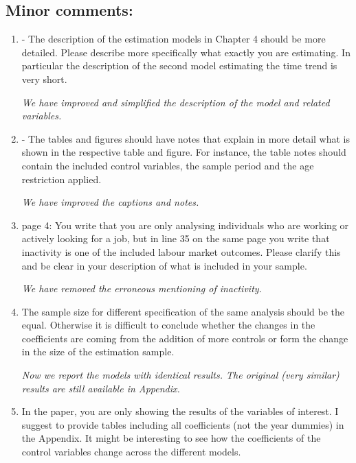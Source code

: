 \documentclass{article}
\newenvironment{response}
{\slshape}{}
\begin{document}
\subsection{Minor comments:}

\begin{enumerate}
\item- The description of the estimation models in Chapter 4 should
  be more detailed. Please describe more specifically what exactly you
  are estimating. In particular the description of the second model
  estimating the time trend is very short.

  \begin{response}
    We have improved and simplified the description of the model and related variables.
  \end{response}
\item - The tables and figures should have notes that explain in more
  detail what is shown in the respective table and figure. For
  instance, the table notes should contain the included control
  variables, the sample period and the age restriction applied.

  \begin{response}
    We have improved the captions and notes.
  \end{response}

\item page 4: You write that you are only analysing individuals who are
working or actively looking for a job, but in line 35 on the same page
you write that inactivity is one of the included labour market
outcomes. Please clarify this and be clear in your description of what
is included in your sample.

\begin{response}
  We have removed the erroneous mentioning of inactivity. 
\end{response}
\item  The sample size for different specification of the same analysis
  should be the equal. Otherwise it is difficult to conclude whether the
  changes in the coefficients are coming from the addition of more
  controls or form the change in the size of the estimation sample.

  \begin{response}
    Now we report the models with identical results.  The original
    (very similar)
    results are still available in Appendix.
  \end{response}

\item In the paper, you are only showing the results of the variables of
  interest. I suggest to provide tables including all coefficients (not
  the year dummies) in the Appendix. It might be interesting to see how
  the coefficients of the control variables change across the different
  models.


\end{enumerate}
\end{document}
